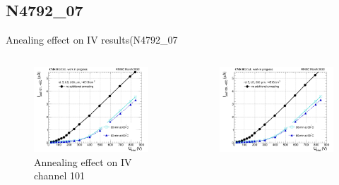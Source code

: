 \documentclass{beamer}
\begin{document}
\subsection{N4792\_07}

\begin{frame}{Anealing effect on IV results(N4792\_07 }
  \begin{columns}
       \begin{figure}
           \includegraphics[width=1.0\textwidth]{plots/8in_198ch_2019_N4792_7_neg40degC_annealing_IV_ch101.png}
           \caption{Annealing effect on IV channel 101 }
       \end{figure}
       \begin{figure}
           \includegraphics[width=1.0\textwidth]{plots/8in_198ch_2019_N4792_7_neg40degC_annealing_IV_ch109.png}

\end{figure}
\end{columns}
\end{frame}
\end{document}
